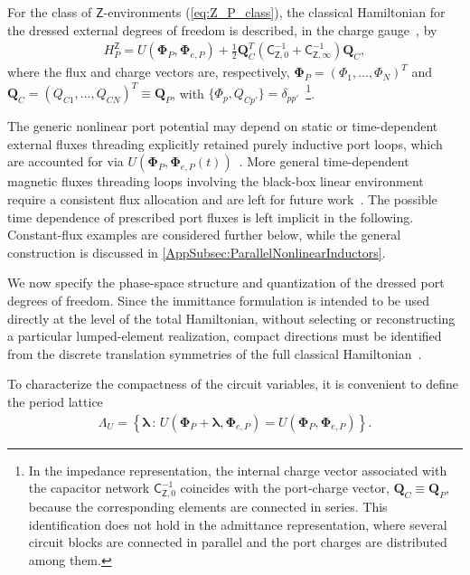 \documentclass[prx,aps,twocolumn,article]{revtex4-2}
\newcommand{\msf}[1]{\mathsf{#1}}
\newcommand{\bsb}[1]{\boldsymbol{#1}}
\newcommand{\bPhi}{\bsb{\Phi}}
\newcommand{\bQ}{\bsb{Q}}
\newcommand{\msZ}{\msf{Z}}
\newcommand{\msC}{\msf{C}}
\begin{document}
For the class of $\msZ$-environments (\ref{eq:Z_P_class}), the classical Hamiltonian for
the dressed external degrees of freedom is described, in the charge gauge~\cite{Roth:2019,Mehta:2022}, by
\begin{align}
    H_P^\msZ
    =
    U(\bPhi_P,\bPhi_{e,P})
    +
    \frac{1}{2}
    \bQ_C^T
    \left(
        \msC_{\msZ,0}^{-1}
        +
        \msC_{\msZ,\infty}^{-1}
    \right)
    \bQ_C,
    \label{Eq:ExternalHamiltonianZ}
\end{align}
where the flux and charge vectors are, respectively, $\bPhi_P=(\Phi_1,\ldots,\Phi_N)^T$ and $\bQ_C=(Q_{C1},\ldots,Q_{CN})^T\equiv\bQ_P$, with $\{\Phi_p,Q_{Cp'}\}=\delta_{pp'}$~\footnote{In the impedance representation, the internal charge vector associated with the capacitor network $\msC_{\msZ,0}^{-1}$ coincides with the port-charge vector, $\bQ_C\equiv\bQ_P$, because the corresponding elements are connected in series. This identification does not hold in the admittance representation, where several circuit blocks are connected in parallel and the port charges are distributed among them.}.

The generic nonlinear port potential may depend on static or time-dependent external fluxes threading explicitly retained purely inductive port loops, which are accounted for via $U(\bPhi_P,\bPhi_{e,P}(t))$~\cite{You:2019,ParraRodriguez:2025}. More general time-dependent magnetic fluxes threading loops involving the black-box linear environment require a consistent flux allocation and are left for future work~\cite{Riwar:2022}. The possible time dependence of prescribed port fluxes is left implicit in the following. Constant-flux examples are considered further below, while the general construction is discussed in \cref{AppSubsec:ParallelNonlinearInductors}.

We now specify the phase-space structure and quantization of the dressed port degrees of freedom. Since the immittance formulation is intended to be used directly at the level of the total Hamiltonian, without selecting or reconstructing a particular lumped-element realization, compact directions must be identified from the discrete translation symmetries of the full classical Hamiltonian~\cite{Devoret:2021,ParraRodriguez:2024,ParraRodriguez:2025}.

To characterize the compactness of the circuit variables, it is convenient to define the period lattice
\begin{align}
\Lambda_U = \left\{\boldsymbol{\lambda}\,:\,
U(\bPhi_P+\boldsymbol{\lambda},\bPhi_{e,P})
=U(\bPhi_P,\bPhi_{e,P}) \right\}.
\label{Eq:PortPotentialPeriodLattice}
\end{align}
\end{document}
